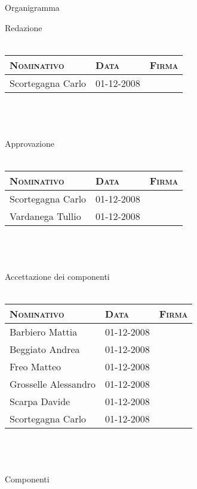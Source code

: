 \documentclass[11pt,a4paper]{article}
\begin{document}
\begin{center}
	\Huge Organigramma \\
\end{center}
\Large Redazione \\ \\
\normalsize
\begin{tabular}{|p{}|l|p{}|}
\hline
\textsc{Nominativo} & \textsc{Data} & \textsc{Firma} \\
\hline
\hline
Scortegagna Carlo & 01-12-2008 & \\
\hline
\end{tabular} \\ \\ \\
\Large Approvazione \\ \\
\normalsize
\begin{tabular}{|p{}|l|p{}|}
\hline
\textsc{Nominativo} & \textsc{Data} & \textsc{Firma} \\
\hline
\hline
Scortegagna Carlo & 01-12-2008 & \\
\hline
Vardanega Tullio & 01-12-2008 & \\
\hline
\end{tabular} \\ \\ \\
\Large Accettazione dei componenti \\ \\
\normalsize
\begin{tabular}{|p{}|l|p{}|}
\hline
\textsc{Nominativo} & \textsc{Data} & \textsc{Firma} \\
\hline
\hline
Barbiero Mattia & 01-12-2008 & \\
\hline
Beggiato Andrea & 01-12-2008 & \\
\hline
Freo Matteo & 01-12-2008 & \\
\hline
Grosselle Alessandro & 01-12-2008 & \\
\hline
Scarpa Davide & 01-12-2008 & \\
\hline
Scortegagna Carlo & 01-12-2008 & \\
\hline
\end{tabular} \\ \\ \\
\Large Componenti \\ \\
\normalsize
\end{document}
